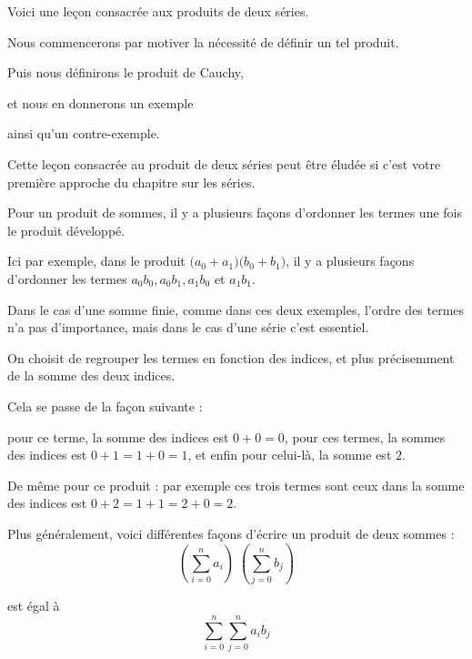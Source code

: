 






\debuttexte


\diapo

Voici une leçon consacrée aux produits de deux séries.

\change
\change
Nous commencerons par motiver la nécessité de définir un tel produit.

\change
Puis nous définirons le produit de Cauchy,

\change
et nous en donnerons un exemple

\change
ainsi qu'un contre-exemple.

Cette leçon consacrée au produit de deux séries peut être éludée si c'est votre 
première approche du chapitre sur les séries.

\diapo

Pour un produit de sommes, il y a plusieurs façons d'ordonner les termes 
une fois le produit développé. 

\change
Ici par exemple, dans le produit $\big(a_0+a_1\big)\big(b_0+b_1\big)$, il y a plusieurs façons d'ordonner les termes $a_0b_0, a_0b_1, a_1b_0$ et $a_1b_1$.

Dans le cas d'une somme finie, comme dans ces deux exemples, l'ordre des termes n'a pas d'importance, mais dans le cas d'une série c'est essentiel.

\change
On choisit de regrouper les termes en fonction des indices, 
et plus précisemment de la somme des deux indices.

\change
Cela se passe de la façon suivante :

pour ce terme, la somme des indices est $0+0=0$, 
pour ces termes, 
la sommes des indices est $0+1=1+0=1$, et enfin pour celui-là, la somme est $2$.

\change
De même pour ce produit : par exemple ces trois termes sont ceux dans la somme des indices est $0+2=1+1=2+0=2$.

\change
Plus généralement, voici différentes façons d'écrire un produit de deux sommes :
$$\left(\sum_{i=0}^n a_i\right)\; \left(\sum_{j=0}^n b_j\right)$$

\change
est égal à
$$
\sum_{i=0}^n \sum_{j=0}^n a_ib_j$$


